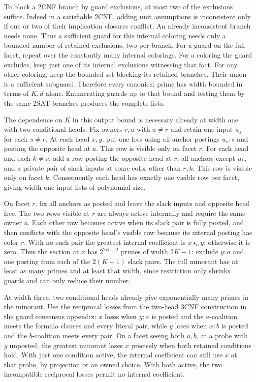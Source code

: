 To block a 2CNF branch by guard exclusions,
at most two of the exclusions suffice. Indeed
in a satisfiable 2CNF, adding unit assumptions
is inconsistent only if one or two of their
implication closures conflict. An already
inconsistent branch needs none. Thus a sufficient
guard for this internal coloring needs only a
bounded number of retained exclusions, two per
branch. For a guard on the full facet, repeat
over the constantly many internal colorings.
For a coloring the guard excludes, keep just
one of its internal exclusions witnessing that
fact. For any other coloring, keep the bounded
set blocking its retained branches. Their union
is a sufficient subguard. Therefore every
canonical prime has width bounded in terms of
$K,d$ alone. Enumerating guards up to that
bound and testing them by the same 2SAT
branches produces the complete lists.

The dependence on $K$ in this output bound is
necessary already at width one with two conditional
heads. Fix owners $r,a$ with $a\ne r$ and retain
one input $u_s$ for each $s\ne r$. At each head
$x,y$, put one loss using all anchor postings
$u_s:s$ and posting the opposite head at $a$.
This row is visible only on facet $r$. For each
head and each $k\ne r$, add a row posting
the opposite head at $r$, all anchors except
$u_k$, and a private pair of slack inputs at
some color other than $r,k$. This row is visible
only on facet $k$. Consequently each head
has exactly one visible row per facet, giving
width-one input lists of polynomial size.

On facet $r$, fix all anchors as posted and
leave the slack inputs and opposite head free.
The two rows visible at $r$ are always active
internally and require the same owner $a$.
Each other row becomes active when its slack
pair is fully posted, and then conflicts with
the opposite head's visible row because its
internal posting has color $r$. With no such
pair the greatest internal coefficient is
$x\star_a y$; otherwise it is zero. Thus the
section at $x$ has $2^{2K-2}$ primes of
width $2K-1$: exclude $y:a$ and one posting
from each of the $2(K-1)$ slack pairs.
The full minorant has at least as many
primes and at least that width, since
restriction only shrinks guards and can
only reduce their number.

At width three, two conditional heads already
give exponentially many primes in the minorant.
Use the reciprocal losses from the two-head
3CNF construction in the guard consensus
appendix: $x$ loses when $y:a$ is posted and
the $a$-coalition meets the formula clauses
and every literal pair, while $y$ loses when
$x:b$ is posted and the $b$-coalition meets
every pair. On a facet seeing both $a,b$,
at a probe with $y$ unposted,
the greatest minorant loses $x$ precisely
when both retained conditions hold. With just
one condition active, the internal coefficient
can still use $x$ at that probe, by projection
or an owned choice. With both active, the
two incompatible reciprocal losses permit
no internal coefficient.

